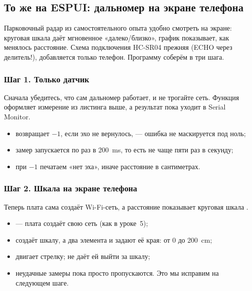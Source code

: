 \subsection{То же на ESPUI: дальномер на экране телефона}

Парковочный радар из самостоятельного опыта удобно смотреть на экране: круговая шкала даёт
мгновенное «далеко/близко», график показывает, как менялось расстояние. Схема подключения
HC-SR04 прежняя (ECHO через делитель!), добавляется только телефон. Программу соберём в три шага.

\subsubsection{Шаг 1. Только датчик}

Сначала убедитесь, что сам дальномер работает, и не трогайте сеть. Функция 
оформляет измерение из листинга выше, а результат пока уходит в Serial Monitor.


\begin{itemize}[leftmargin=*]
  \item {} возвращает $-1$, если эхо не вернулось, --- ошибка не маскируется под ноль;
  \item замер запускается по  раз в \SI{200}{ms}, то есть не чаще пяти раз в секунду;
  \item при $-1$ печатаем «нет эха», иначе расстояние в сантиметрах.
\end{itemize}

\subsubsection{Шаг 2. Шкала на экране телефона}

Теперь плата сама создаёт Wi-Fi-сеть, а расстояние показывает круговая шкала .


\begin{itemize}[leftmargin=*]
  \item {} --- плата создаёт свою сеть (как в уроке~5);
  \item {} создаёт шкалу, а два элемента  и 
        задают её края: от 0 до \SI{200}{cm};
  \item {} двигает стрелку;  не даёт ей выйти за шкалу;
  \item неудачные замеры пока просто пропускаются. Это мы исправим на следующем шаге.
\end{itemize}

